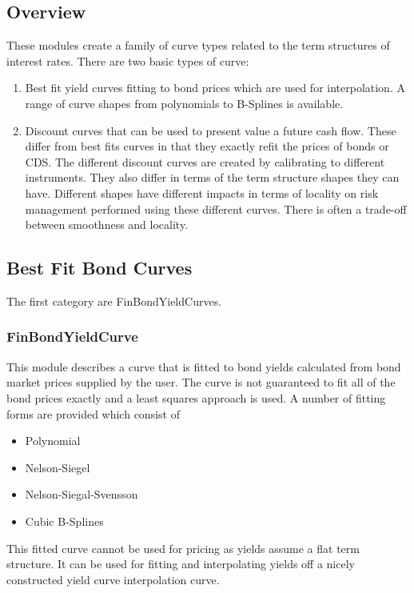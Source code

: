 \documentclass[twoside,11pt]{book}
\begin{document}
\subsection*{Overview}
These modules create a family of curve types related to the term structures of interest rates. There are two basic types of curve:

\begin{enumerate}
\item{ Best fit yield curves fitting to bond prices which are used for interpolation. A range of curve shapes from polynomials to B-Splines is available.
}
\item{ Discount curves that can be used to present value a future cash flow. These differ from best fits curves in that they exactly refit the prices of bonds or CDS. The different discount curves are created by calibrating to different instruments. They also differ in terms of the term structure shapes they can have. Different shapes have different impacts in terms of locality on risk management performed using these different curves. There is often a trade-off between smoothness and locality.
}
\end{enumerate}


\subsection*{Best Fit Bond Curves}
The first category are FinBondYieldCurves.


\subsubsection*{FinBondYieldCurve}
This module describes a curve that is fitted to bond yields calculated from bond market prices supplied by the user. The curve is not guaranteed to fit all of the bond prices exactly and a least squares approach is used. A number of fitting forms are provided which consist of 

\begin{itemize}
\item{ Polynomial 
}
\item{ Nelson-Siegel
}
\item{ Nelson-Siegal-Svensson
}
\item{ Cubic B-Splines
}
\end{itemize}

This fitted curve cannot be used for pricing as yields assume a flat term structure. It can be used for fitting and interpolating yields off a nicely constructed yield curve interpolation curve.
\end{document}

